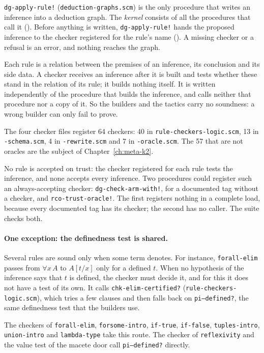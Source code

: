 \texttt{dg-apply-rule!} (\texttt{deduction-graphs.scm}) is the only
procedure that writes an inference into a deduction graph.  The
\emph{kernel} consists of all the procedures that call it ().
Before anything is written, \texttt{dg-apply-rule!} hands the proposed inference to the checker
registered for the rule's name ().  A missing checker or a
refusal is an error, and nothing reaches the graph.

Each rule is a relation between the premises of an inference, its
conclusion and its side data.  A checker receives an inference after it
is built and tests whether these stand in the relation of its rule; it
builds nothing itself.  It is written
independently of the procedure that builds the inference, and calls
neither that procedure nor a copy of it.  So the builders and the
tactics carry no soundness: a wrong builder can only fail to prove.

The four checker files register 64 checkers: 40 in
\texttt{rule-checkers-logic.scm}, 13 in \texttt{-schema.scm}, 4 in
\texttt{-rewrite.scm} and 7 in \texttt{-oracle.scm}.  The 57 that are
not oracles are the subject of Chapter~\ref{ch:meta-k2}.

No rule is accepted on trust: the checker registered for each rule
tests the inference, and none accepts every inference.  Two procedures
could register such an always-accepting checker: \texttt{dg-check-arm-with!}, for a documented
tag without a checker, and \texttt{rco-trust-oracle!}.  The first
registers nothing in a complete load, because every documented tag has
its checker; the second has no caller.  The suite checks both.

\paragraph{One exception: the definedness test is shared.}  Several
rules are sound only when some term denotes.  For instance,
\texttt{forall-elim} passes from $\forall x\,A$ to $A[t/x]$ only for a
defined $t$.  When no hypothesis of the inference says that $t$ is
defined, the checker must decide it, and for this it does not have a
test of its own.  It calls \texttt{chk-elim-certified?}
(\texttt{rule-checkers-logic.scm}), which tries a few clauses and then
falls back on \texttt{pi--defined?}, the same definedness test that the
builders use.

The checkers of \texttt{forall-elim}, \texttt{forsome-intro},
\texttt{if-true}, \texttt{if-false}, \texttt{tuples-intro},
\texttt{union-intro} and \texttt{lambda-type} take this route.  The
checker of \texttt{reflexivity} and the value test of the macete door
call \texttt{pi--defined?} directly.

